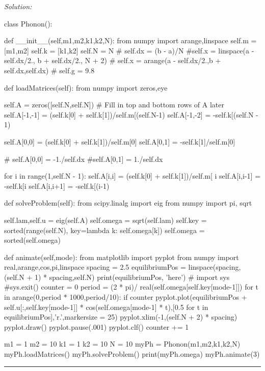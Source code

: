 \ifsolutions
\textit{Solution:}\\
\begin{codeexample}
\begin{VerbatimOut}{\listingFile}


class Phonon():

    def __init__(self,m1,m2,k1,k2,N):
        from numpy import arange,linspace
        self.m = [m1,m2]
        self.k = [k1,k2]
        self.N = N
        #        self.dx = (b - a)/N
        #self.x = linspace(a - self.dx/2., b + self.dx/2., N + 2)
        #        self.x = arange(a - self.dx/2.,b + self.dx,self.dx)
        # self.g = 9.8

    def loadMatrices(self):
        from numpy import zeros,eye

        self.A = zeros([self.N,self.N])
        # Fill in top and bottom rows of A later
        self.A[-1,-1] = (self.k[0] + self.k[1])/self.m[(self.N-1) %
        self.A[-1,-2] = -self.k[(self.N - 1) %
            
        self.A[0,0] = (self.k[0] + self.k[1])/self.m[0]
        self.A[0,1] = -self.k[1]/self.m[0]

        #        self.A[0,0] = -1./self.dx
        #self.A[0,1] = 1./self.dx


        for i in range(1,self.N - 1):
            self.A[i,i] = (self.k[0] + self.k[1])/self.m[ i%
            self.A[i,i-1] = -self.k[i%
            self.A[i,i+1] =  -self.k[(i-1)%
 


    def solveProblem(self):
        from scipy.linalg import eig
        from numpy import pi, sqrt

        self.lam,self.u = eig(self.A)
        self.omega = sqrt(self.lam) 
        self.key = sorted(range(self.N), key=lambda k: self.omega[k])
        self.omega = sorted(self.omega)
        
    def animate(self,mode):
        from matplotlib import pyplot
        from numpy import real,arange,cos,pi,linspace
        spacing = 2.5
        equilibriumPos = linspace(spacing,(self.N + 1) * spacing,self.N)
        print(equilibriumPos, 'here')
        #  import sys
        #sys.exit()
        counter = 0
        period = (2 * pi)/ real(self.omega[self.key[mode-1]])
        for t in arange(0,period * 1000,period/10):
            if counter %
                pyplot.plot(equilibriumPos + self.u[:,self.key[mode-1]] * cos(self.omega[mode-1] * t),[0.5 for t in equilibriumPos],'r.',markersize = 25)
                pyplot.xlim(-1,(self.N + 2) * spacing)
                pyplot.draw()
                pyplot.pause(.001)
                pyplot.clf()
            counter += 1 

m1 = 1
m2 = 10
k1 = 1
k2 = 10
N = 10
myPh = Phonon(m1,m2,k1,k2,N)
myPh.loadMatrices()
myPh.solveProblem()
print(myPh.omega)
myPh.animate(3)


\end{VerbatimOut}
\end{codeexample}
\else
\noindent\rule{5 in}{0.01 in}
\fi



